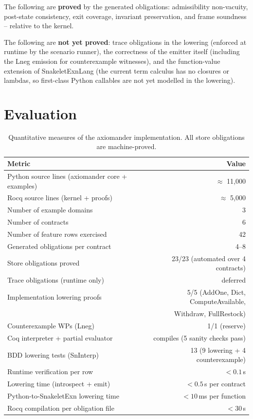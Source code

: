 \documentclass[11pt,a4paper]{article}
\begin{document}
\noindent The following are \textbf{proved} by the generated obligations:
admissibility non-vacuity, post-state consistency, exit coverage,
invariant preservation, and frame soundness -- relative to the kernel.

\noindent The following are \textbf{not yet proved}:
trace obligations in the lowering (enforced at runtime by the
scenario runner), the correctness of the emitter itself
(including the Lneg emission for counterexample witnesses), and
the function-value extension of SnakeletExnLang (the current term
calculus has no closures or lambdas, so first-class Python
callables are not yet modelled in the lowering).

\section{Evaluation}\label{sec:evaluation}

\begin{table}[t]
\centering\small
\begin{tabular}{@{}lr@{}}
\toprule
\textbf{Metric} & \textbf{Value} \\
\midrule
Python source lines (axiomander core + examples) & $\approx$ 11,000 \\
Rocq source lines (kernel + proofs) & $\approx$ 5,000 \\
Number of example domains & 3 \\
Number of contracts & 6 \\
Number of feature rows exercised & 42 \\
Generated obligations per contract & 4--8 \\
Store obligations proved & 23/23 (automated over 4 contracts) \\
Trace obligations (runtime only) & deferred \\
Implementation lowering proofs & 5/5 (AddOne, Dict, ComputeAvailable,\\
 & Withdraw, FullRestock) \\
Counterexample WPs (Lneg) & 1/1 (reserve) \\
Coq interpreter + partial evaluator & compiles (5 sanity checks pass) \\
BDD lowering tests (SnInterp) & 13 (9 lowering + 4 counterexample) \\
Runtime verification per row & $< 0.1$\,s \\
Lowering time (introspect + emit) & $< 0.5$\,s per contract \\
Python-to-SnakeletExn lowering time & $< 10$\,ms per function \\
Rocq compilation per obligation file & $< 30$\,s \\
\bottomrule
\end{tabular}
\caption{Quantitative measures of the \textsf{axiomander} implementation.
All store obligations are machine-proved.}
\label{tab:metrics}
\end{table}
\end{document}
